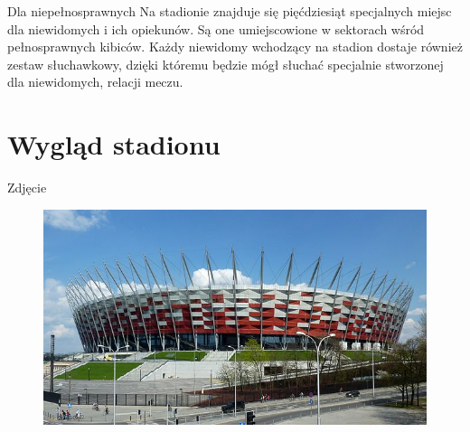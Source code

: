 \documentclass{beamer}
\begin{document}
	\begin{frame}{Dla niepełnosprawnych}
	Na stadionie znajduje się pięćdziesiąt specjalnych miejsc dla niewidomych i ich opiekunów. Są one umiejscowione w sektorach wśród pełnosprawnych kibiców. Każdy niewidomy wchodzący na stadion dostaje również zestaw słuchawkowy, dzięki któremu będzie mógł słuchać specjalnie stworzonej dla niewidomych, relacji meczu.
	\end{frame}
	
	\section{Wygląd stadionu}
	\begin{frame}{Zdjęcie}
		\begin{figure}
			\begin{center}
			\includegraphics[scale=0.5]{stadion.jpg}
			\end{center}
		\end{figure}
	\end{frame}
\end{document}
